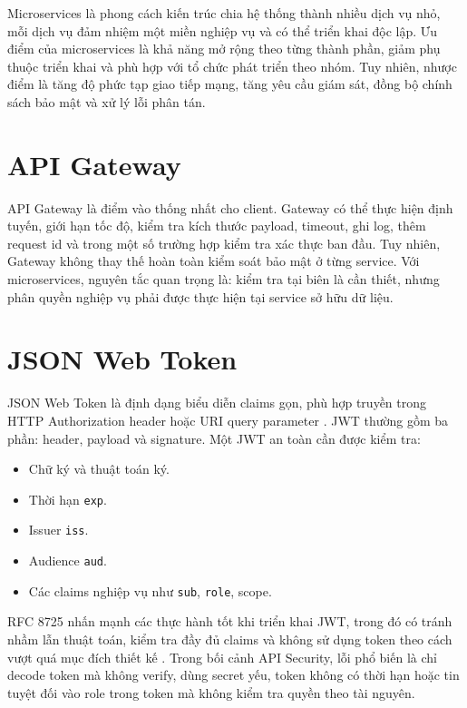 \documentclass[14pt,a4paper]{extreport}
\begin{document}
Microservices là phong cách kiến trúc chia hệ thống thành nhiều dịch vụ nhỏ, mỗi dịch vụ đảm nhiệm một miền nghiệp vụ và có thể triển khai độc lập. Ưu điểm của microservices là khả năng mở rộng theo từng thành phần, giảm phụ thuộc triển khai và phù hợp với tổ chức phát triển theo nhóm. Tuy nhiên, nhược điểm là tăng độ phức tạp giao tiếp mạng, tăng yêu cầu giám sát, đồng bộ chính sách bảo mật và xử lý lỗi phân tán.

\section{API Gateway}
API Gateway là điểm vào thống nhất cho client. Gateway có thể thực hiện định tuyến, giới hạn tốc độ, kiểm tra kích thước payload, timeout, ghi log, thêm request id và trong một số trường hợp kiểm tra xác thực ban đầu. Tuy nhiên, Gateway không thay thế hoàn toàn kiểm soát bảo mật ở từng service. Với microservices, nguyên tắc quan trọng là: kiểm tra tại biên là cần thiết, nhưng phân quyền nghiệp vụ phải được thực hiện tại service sở hữu dữ liệu.

\section{JSON Web Token}
JSON Web Token là định dạng biểu diễn claims gọn, phù hợp truyền trong HTTP Authorization header hoặc URI query parameter \cite{jwt7519}. JWT thường gồm ba phần: header, payload và signature. Một JWT an toàn cần được kiểm tra:
\begin{itemize}
  \item Chữ ký và thuật toán ký.
  \item Thời hạn \texttt{exp}.
  \item Issuer \texttt{iss}.
  \item Audience \texttt{aud}.
  \item Các claims nghiệp vụ như \texttt{sub}, \texttt{role}, scope.
\end{itemize}

RFC 8725 nhấn mạnh các thực hành tốt khi triển khai JWT, trong đó có tránh nhầm lẫn thuật toán, kiểm tra đầy đủ claims và không sử dụng token theo cách vượt quá mục đích thiết kế \cite{jwt8725}. Trong bối cảnh API Security, lỗi phổ biến là chỉ decode token mà không verify, dùng secret yếu, token không có thời hạn hoặc tin tuyệt đối vào role trong token mà không kiểm tra quyền theo tài nguyên.
\end{document}
